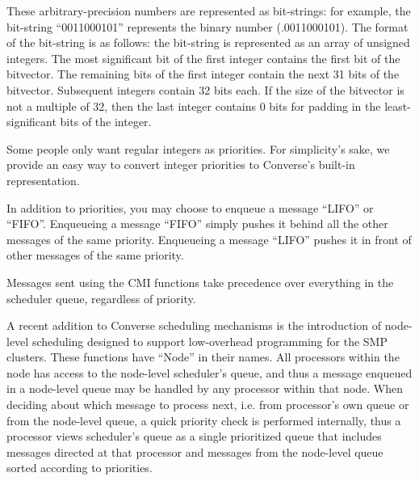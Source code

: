 These arbitrary-precision numbers are represented as bit-strings: for
example, the bit-string ``0011000101'' represents the binary number
(.0011000101).  The format of the bit-string is as follows: the
bit-string is represented as an array of unsigned integers. The most
significant bit of the first integer contains the first bit of the
bitvector.  The remaining bits of the first integer contain the next
31 bits of the bitvector.  Subsequent integers contain 32 bits
each. If the size of the bitvector is not a multiple of 32, then the
last integer contains 0 bits for padding in the least-significant bits
of the integer.

Some people only want regular integers as priorities.  For
simplicity's sake, we provide an easy way to convert integer
priorities to Converse's built-in representation.

In addition to priorities, you may choose to enqueue a message
``LIFO'' or ``FIFO''.  Enqueueing a message ``FIFO'' simply pushes it
behind all the other messages of the same priority.  Enqueueing a
message ``LIFO'' pushes it in front of other messages of the same
priority.

Messages sent using the CMI functions take precedence over everything
in the scheduler queue, regardless of priority.

A recent addition to Converse scheduling mechanisms is the introduction of
node-level scheduling designed to support low-overhead programming for the
SMP clusters. These functions have ``Node'' in their names. All processors
within the node has access to the node-level scheduler's queue, and thus
a message enqueued in a node-level queue may be handled by any processor within
that node. When deciding about which message to process next, i.e. from
processor's own queue or from the node-level queue, a quick priority check
is performed internally, thus a processor views scheduler's queue as a single
prioritized queue that includes messages directed at that processor and
messages from the node-level queue sorted according to priorities.


